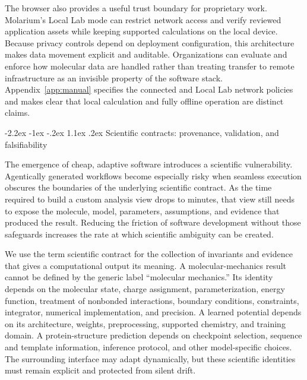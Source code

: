 \documentclass[11pt]{article}
\makeatletter
\renewcommand\section{\@startsection{section}{1}{\z@}%
  {-2.2ex \@plus -1ex \@minus -.2ex}%
  {1.1ex \@plus .2ex}%
  {\normalfont\Large\bfseries\color{molblue}}}
\makeatother
\begin{document}
The browser also provides a useful trust boundary for proprietary work. Molarium's Local Lab mode can restrict network access and verify reviewed application assets while keeping supported calculations on the local device. Because privacy controls depend on deployment configuration, this architecture makes data movement explicit and auditable. Organizations can evaluate and enforce how molecular data are handled rather than treating transfer to remote infrastructure as an invisible property of the software stack. Appendix~\ref{app:manual} specifies the connected and Local Lab network policies and makes clear that local calculation and fully offline operation are distinct claims.

\section{Scientific contracts: provenance, validation, and falsifiability}

The emergence of cheap, adaptive software introduces a scientific vulnerability. Agentically generated workflows become especially risky when seamless execution obscures the boundaries of the underlying scientific contract. As the time required to build a custom analysis view drops to minutes, that view still needs to expose the molecule, model, parameters, assumptions, and evidence that produced the result. Reducing the friction of software development without those safeguards increases the rate at which scientific ambiguity can be created.

We use the term scientific contract for the collection of invariants and evidence that gives a computational output its meaning. A molecular-mechanics result cannot be defined by the generic label ``molecular mechanics.'' Its identity depends on the molecular state, charge assignment, parameterization, energy function, treatment of nonbonded interactions, boundary conditions, constraints, integrator, numerical implementation, and precision. A learned potential depends on its architecture, weights, preprocessing, supported chemistry, and training domain. A protein-structure prediction depends on checkpoint selection, sequence and template information, inference protocol, and other model-specific choices. The surrounding interface may adapt dynamically, but these scientific identities must remain explicit and protected from silent drift.
\end{document}
